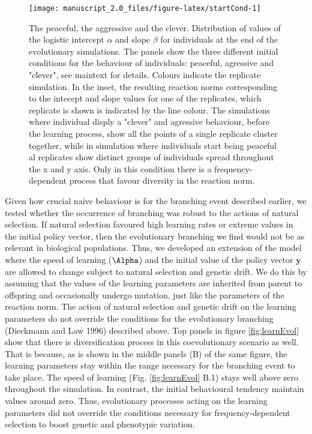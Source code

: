 \documentclass[
  12pt,
]{article}
\begin{document}
\begin{figure}

{\centering \texttt{[image: manuscript\_2.0\_files/figure-latex/startCond-1]} 

}

\caption{The peaceful, the aggressive and the clever. Distribution of values of the logistic intercept $\alpha$ and slope $\beta$ for individuals at the end of the evolutionary simulations. The panels show the three different initial conditions for the behaviour of individuals: peaceful, agressive and  "clever", see maintext for details. Colours indicate the replicate simulation. In the inset, the resulting reaction norms corresponding to the intecept and slope values for one of the replicates, which replicate is shown is indicated by the line colour. The simulations where individual disply a "clever" and agressive behaviour, before the learning process, show all the points of a single replicate cluster together, while in simulation where individuals start being peaceful al replicates show distinct groups of individuals spread throughout the x and y axis. Only in this condition there is a frequency-dependent process that favour diversity in the reaction norm.}\label{fig:startCond}
\end{figure}

Given how crucial naive behaviour is for the branching event described
earlier, we tested whether the occurrence of branching was robust to the
actions of natural selection. If natural selection favoured high
learning rates or extreme values in the initial policy vector, then the
evolutionary branching we find would not be as relevant in biological
populations. Thus, we developed an extension of the model where the
speed of learning (\(\Alpha\)) and the initial value of the policy
vector \(\symbf{y}\) are allowed to change subject to natural selection
and genetic drift. We do this by assuming that the values of the
learning parameters are inherited from parent to offspring and
occasionally undergo mutation, just like the parameters of the reaction
norm. The action of natural selection and genetic drift on the learning
parameters do not override the conditions for the evolutionary branching
(Dieckmann and Law 1996) described above. Top panels in figure
\ref{fig:learnEvol} show that there is diversification process in this
coevolutionary scenario as well. That is because, as is shown in the
middle panels (B) of the same figure, the learning parameters stay
within the range necessary for the branching event to take place. The
speed of learning (Fig. \ref{fig:learnEvol} B.1) stays well above zero
throughout the simulation. In contrast, the initial behavioural tendency
maintain values around zero. Thus, evolutionary processes acting on the
learning parameters did not override the conditions necessary for
frequency-dependent selection to boost genetic and phenotypic variation.
\end{document}
